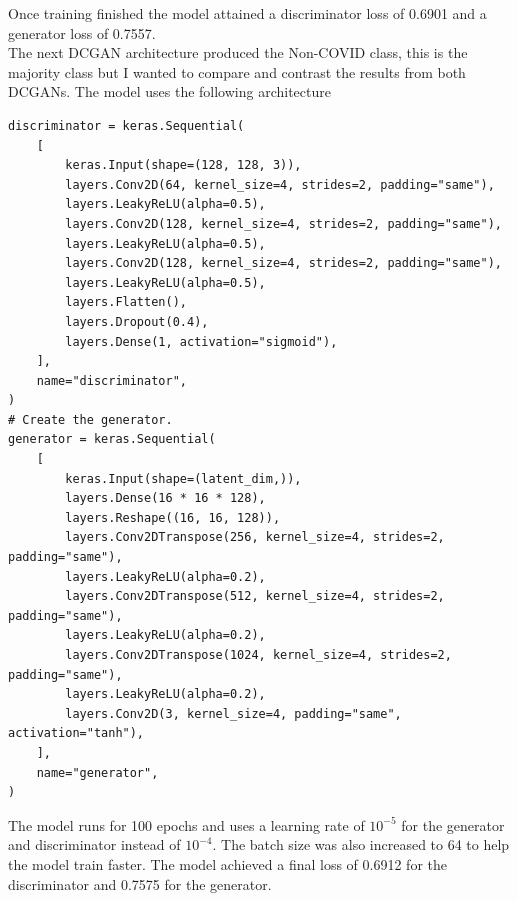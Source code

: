 Once training finished the model attained a discriminator loss of 0.6901 and a generator loss of 0.7557.
\\ 
The next DCGAN architecture produced the Non-COVID class, this is the majority class but I wanted to compare and contrast the results from both DCGANs.  The model uses the following architecture 
\begin{verbatim}
discriminator = keras.Sequential(
    [
        keras.Input(shape=(128, 128, 3)),
        layers.Conv2D(64, kernel_size=4, strides=2, padding="same"),
        layers.LeakyReLU(alpha=0.5),
        layers.Conv2D(128, kernel_size=4, strides=2, padding="same"),
        layers.LeakyReLU(alpha=0.5),
        layers.Conv2D(128, kernel_size=4, strides=2, padding="same"),
        layers.LeakyReLU(alpha=0.5),
        layers.Flatten(),
        layers.Dropout(0.4),
        layers.Dense(1, activation="sigmoid"),
    ],
    name="discriminator",
)
# Create the generator.
generator = keras.Sequential(
    [
        keras.Input(shape=(latent_dim,)),
        layers.Dense(16 * 16 * 128),
        layers.Reshape((16, 16, 128)),
        layers.Conv2DTranspose(256, kernel_size=4, strides=2, padding="same"),
        layers.LeakyReLU(alpha=0.2),
        layers.Conv2DTranspose(512, kernel_size=4, strides=2, padding="same"),
        layers.LeakyReLU(alpha=0.2),
        layers.Conv2DTranspose(1024, kernel_size=4, strides=2, padding="same"),
        layers.LeakyReLU(alpha=0.2),
        layers.Conv2D(3, kernel_size=4, padding="same", activation="tanh"),
    ],
    name="generator",
)
\end{verbatim}
The model runs for 100 epochs and uses a learning rate of $10^{-5}$ for the generator and discriminator instead of $10^{-4}$.  The batch size was also increased to 64 to help the model train faster.  The model achieved a final loss of 0.6912 for the discriminator and 0.7575 for the generator.

